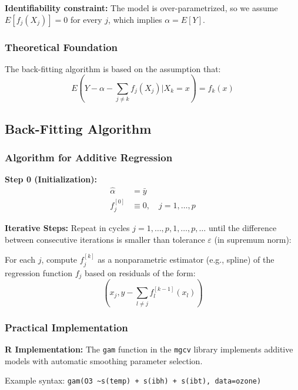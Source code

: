 \documentclass[12pt,a4paper]{article}
\begin{document}
\textbf{Identifiability constraint:} The model is over-parametrized, so we assume $E[f_j(X_j)] = 0$ for every $j$, which implies $\alpha = E[Y]$.

\subsubsection{Theoretical Foundation}

The back-fitting algorithm is based on the assumption that:
\begin{equation}
E\left(Y - \alpha - \sum_{j \neq k} f_j(X_j) \Big| X_k = x\right) = f_k(x)
\end{equation}

\subsection{Back-Fitting Algorithm}

\subsubsection{Algorithm for Additive Regression}

\textbf{Step 0 (Initialization):}
\begin{align}
\hat{\alpha} &= \bar{y} \\
f_j^{[0]} &\equiv 0, \quad j = 1, \ldots, p
\end{align}

\textbf{Iterative Steps:} Repeat in cycles $j = 1, \ldots, p, 1, \ldots, p, \ldots$ until the difference between consecutive iterations is smaller than tolerance $\varepsilon$ (in supremum norm):

For each $j$, compute $f_j^{[k]}$ as a nonparametric estimator (e.g., spline) of the regression function $f_j$ based on residuals of the form:
\begin{equation}
\left(x_j, y - \sum_{l \neq j} f_l^{[k-1]}(x_l)\right)
\end{equation}

\subsubsection{Practical Implementation}

\textbf{R Implementation:} The \texttt{gam} function in the \texttt{mgcv} library implements additive models with automatic smoothing parameter selection.

Example syntax: \texttt{gam(O3 \textasciitilde s(temp) + s(ibh) + s(ibt), data=ozone)}
\end{document}

